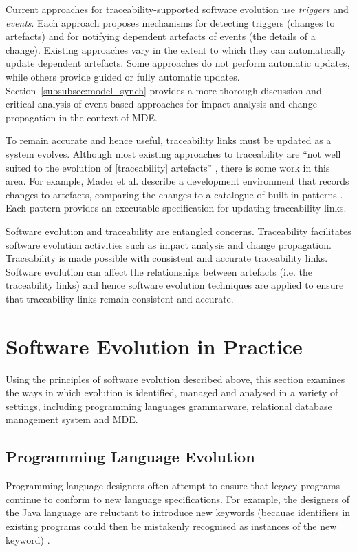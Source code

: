 Current approaches for traceability-supported software evolution use \emph{triggers} and \emph{events}. Each approach proposes mechanisms for detecting triggers (changes to artefacts) and for notifying dependent artefacts of events (the details of a change). Existing approaches vary in the extent to which they can automatically update dependent artefacts. Some \cc approaches \cite{chen99consistency,cleland03eventbased} do not perform automatic updates, while others \cite{aizenbud05operational,costa2007rtmdd} provide guided or fully automatic updates. Section~\ref{subsubsec:model_synch} provides a more thorough discussion and critical analysis of event-based approaches for impact analysis and change propagation in the context of MDE.

To remain accurate and hence useful, traceability links must be updated as a system evolves. Although most existing approaches to traceability are ``not well suited to the evolution of [traceability] artefacts'' \cite[pg. 24]{winkler09survey}, there is some work in this area. For example, Mader et al. describe a development environment that records changes to artefacts, comparing the changes to a catalogue of built-in patterns \cite{mader08rule}. Each pattern provides an executable specification for updating traceability links.

Software evolution and traceability are entangled concerns. Traceability facilitates software evolution activities such as impact analysis and change propagation. Traceability is made possible with consistent and accurate traceability links. Software evolution can affect the relationships between artefacts (i.e. the traceability links) and hence software evolution techniques are applied to ensure that traceability links remain consistent and accurate.

\section{Software Evolution in Practice}
\label{sec:software_evolution_practice}
Using the principles of software evolution described above, this section examines the ways in which evolution is identified, managed and analysed in a variety of settings, including programming languages grammarware, relational database management system and MDE. 

\subsection{Programming Language Evolution}
Programming language designers often attempt to ensure that legacy programs continue to conform to new language specifications. For \cc example, the designers of the Java \cite{java} language are reluctant to introduce new keywords (becauae identifiers in existing programs could then be mistakenly recognised as instances of the new keyword) \cite{cervelle06tatoo}.

